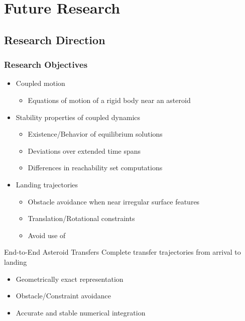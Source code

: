 \section*{Future Research}
\subsection*{Research Direction}

\begin{frame}[t]\frametitle{Research Objectives}

    \begin{itemize}
        \item Coupled motion
        \begin{itemize}
            \item Equations of motion of a rigid body near an asteroid
        \end{itemize}
        \item Stability properties of coupled dynamics
        \begin{itemize}
            \item Existence/Behavior of equilibrium solutions
            \item Deviations over extended time spans
            \item Differences in reachability set computations
        \end{itemize}
        \item Landing trajectories
        \begin{itemize}
            \item Obstacle avoidance when near irregular surface features
            \item Translation/Rotational constraints
            \item Avoid use of 
        \end{itemize}
    \end{itemize}
    \pause
    \begin{block}{End-to-End Asteroid Transfers}
        Complete transfer trajectories from arrival to landing
        \begin{itemize}
            \item Geometrically exact representation
            \item Obstacle/Constraint avoidance
            \item Accurate and stable numerical integration
        \end{itemize}
    \end{block}
\end{frame}